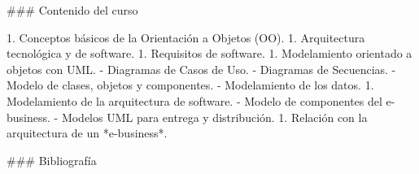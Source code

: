 ### Contenido del curso

1. Conceptos básicos de la Orientación a Objetos (OO).
1. Arquitectura tecnológica y de software.
1. Requisitos de software.
1. Modelamiento orientado a objetos con UML.
    - Diagramas de Casos de Uso.
    - Diagramas de Secuencias.
    - Modelo de clases, objetos y componentes.
    - Modelamiento de los datos.
1. Modelamiento de la arquitectura de software.
    - Modelo de componentes del e-business.
    - Modelos UML para entrega y distribución.
1. Relación con la arquitectura de un *e-business*.

### Bibliografía

\nocite{*}

{\scriptsize
}

